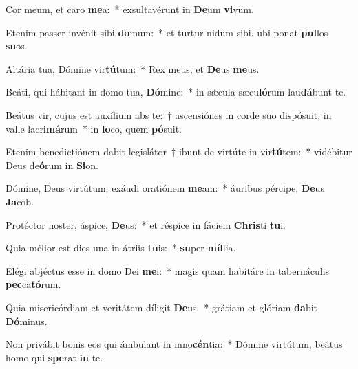 \item Cor meum, et caro \textbf{me}a:~* exsultavérunt in \textbf{De}um \textbf{vi}vum.
\item Etenim passer invénit sibi \textbf{do}mum:~* et turtur nidum sibi, ubi ponat \textbf{pul}los \textbf{su}os.
\item Altária tua, Dómine vir\textbf{tú}tum:~* Rex meus, et \textbf{De}us \textbf{me}us.
\item Beáti, qui hábitant in domo tua, \textbf{Dó}mine:~* in sǽcula sæcu\textbf{ló}rum lau\textbf{dá}bunt te.
\item Beátus vir, cujus est auxílium abs te:~† ascensiónes in corde suo dispósuit, in valle lacri\textbf{má}rum~* in \textbf{lo}co, quem \textbf{pó}suit.
\item Etenim benedictiónem dabit legislátor~† ibunt de virtúte in vir\textbf{tú}tem:~* vidébitur Deus de\textbf{ó}rum in \textbf{Si}on.
\item Dómine, Deus virtútum, exáudi oratiónem \textbf{me}am:~* áuribus pércipe, \textbf{De}us \textbf{Ja}cob.
\item Protéctor noster, áspice, \textbf{De}us:~* et réspice in fáciem \textbf{Chris}ti \textbf{tu}i.
\item Quia mélior est dies una in átriis \textbf{tu}is:~* \textbf{su}per \textbf{míl}lia.
\item Elégi abjéctus esse in domo Dei \textbf{me}i:~* magis quam habitáre in tabernáculis \textbf{pec}ca\textbf{tó}rum.
\item Quia misericórdiam et veritátem díligit \textbf{De}us:~* grátiam et glóriam \textbf{da}bit \textbf{Dó}minus.
\item Non privábit bonis eos qui ámbulant in inno\textbf{cén}tia:~* Dómine virtútum, beátus homo qui \textbf{spe}rat \textbf{in} te.
